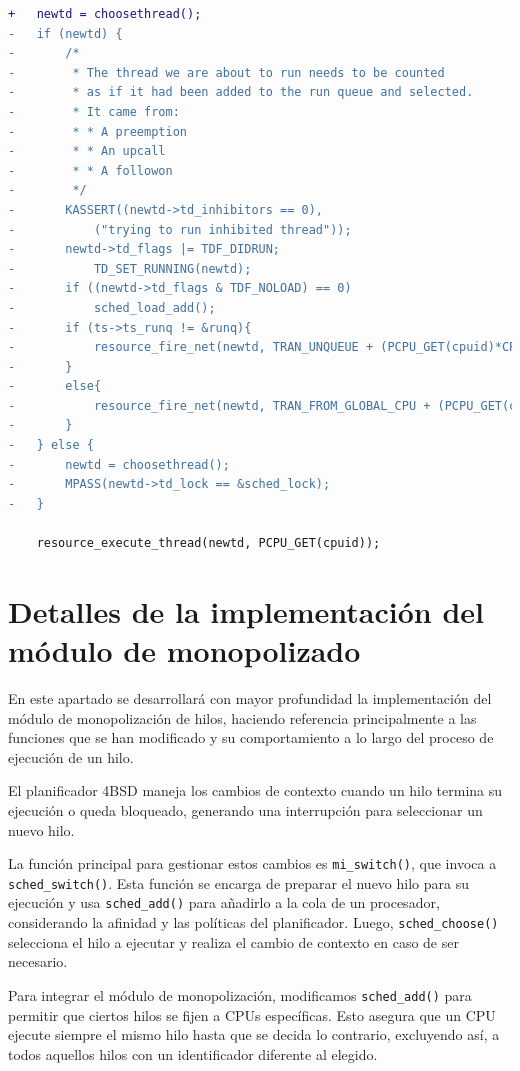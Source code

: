 \begin{lstlisting}[language=diff]
+   newtd = choosethread();
-   if (newtd) {
-       /*
-        * The thread we are about to run needs to be counted
-        * as if it had been added to the run queue and selected.
-        * It came from:
-        * * A preemption
-        * * An upcall
-        * * A followon
-        */
-       KASSERT((newtd->td_inhibitors == 0),
-           ("trying to run inhibited thread"));
-       newtd->td_flags |= TDF_DIDRUN;
-           TD_SET_RUNNING(newtd);
-       if ((newtd->td_flags & TDF_NOLOAD) == 0)
-           sched_load_add();
-       if (ts->ts_runq != &runq){
-           resource_fire_net(newtd, TRAN_UNQUEUE + (PCPU_GET(cpuid)*CPU_BASE_TRANSITIONS));
-       }
-       else{
-           resource_fire_net(newtd, TRAN_FROM_GLOBAL_CPU + (PCPU_GET(cpuid)*CPU_BASE_TRANSITIONS));
-       }
-   } else {
-       newtd = choosethread();
-       MPASS(newtd->td_lock == &sched_lock);
-   }

    resource_execute_thread(newtd, PCPU_GET(cpuid));

\end{lstlisting}

\chapter{Detalles de la implementación del módulo de monopolizado}\label{appendix:apB}

En este apartado se desarrollará con mayor profundidad la implementación del módulo de monopolización de hilos, haciendo referencia principalmente a las funciones que se han modificado y su comportamiento a lo largo del proceso de ejecución de un hilo.

El planificador 4BSD maneja los cambios de contexto cuando un hilo termina su ejecución o queda bloqueado, generando una interrupción para seleccionar un nuevo hilo.

La función principal para gestionar estos cambios es \verb|mi_switch()|, que invoca a \verb|sched_switch()|. Esta función se encarga de preparar el nuevo hilo para su ejecución y usa \verb|sched_add()| para añadirlo a la cola de un procesador, considerando la afinidad y las políticas del planificador. Luego, \verb|sched_choose()| selecciona el hilo a ejecutar y realiza el cambio de contexto en caso de ser necesario.

Para integrar el módulo de monopolización, modificamos \verb|sched_add()| para permitir que ciertos hilos se fijen a CPUs específicas. Esto asegura que un CPU ejecute siempre el mismo hilo hasta que se decida lo contrario, excluyendo así, a todos aquellos hilos con un identificador diferente al elegido.


